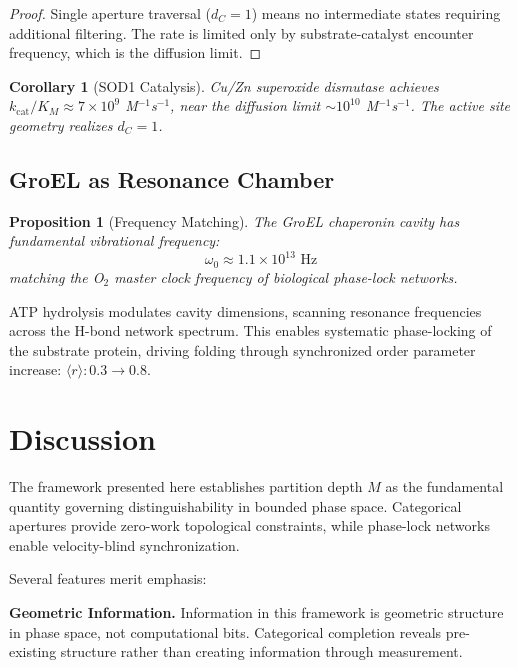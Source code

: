 \documentclass[twocolumn,amsmath,amssymb,aps,prl,superscriptaddress]{revtex4-2}
\newtheorem{proposition}[theorem]{Proposition}
\newtheorem{corollary}[theorem]{Corollary}
\newcommand{\Mpart}{M}
\newcommand{\orderp}{\langle r \rangle}
\begin{document}
\begin{proof}
Single aperture traversal ($d_C = 1$) means no intermediate states requiring additional filtering. The rate is limited only by substrate-catalyst encounter frequency, which is the diffusion limit.
\end{proof}

\begin{corollary}[SOD1 Catalysis]
Cu/Zn superoxide dismutase achieves $k_{\text{cat}}/K_M \approx 7 \times 10^9$ M$^{-1}$s$^{-1}$, near the diffusion limit $\sim 10^{10}$ M$^{-1}$s$^{-1}$. The active site geometry realizes $d_C = 1$.
\end{corollary}

\subsection{GroEL as Resonance Chamber}

\begin{proposition}[Frequency Matching]
The GroEL chaperonin cavity has fundamental vibrational frequency:
\begin{equation}
\omega_0 \approx 1.1 \times 10^{13} \text{ Hz}
\end{equation}
matching the O$_2$ master clock frequency of biological phase-lock networks.
\end{proposition}

ATP hydrolysis modulates cavity dimensions, scanning resonance frequencies across the H-bond network spectrum. This enables systematic phase-locking of the substrate protein, driving folding through synchronized order parameter increase: $\orderp: 0.3 \to 0.8$.

\section{Discussion}

The framework presented here establishes partition depth $\Mpart$ as the fundamental quantity governing distinguishability in bounded phase space. Categorical apertures provide zero-work topological constraints, while phase-lock networks enable velocity-blind synchronization.

Several features merit emphasis:

\textbf{Geometric Information.} Information in this framework is geometric structure in phase space, not computational bits. Categorical completion reveals pre-existing structure rather than creating information through measurement.
\end{document}

